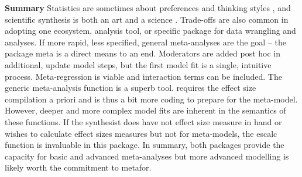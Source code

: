 \documentclass[softwarereview]{jss}
\begin{document}
\textbf{Summary} \newline
Statistics are sometimes about preferences and thinking styles \citep{RN6087}, and scientific synthesis is both an art and a science \citep{RN3629}.  Trade-offs are also common in adopting one ecosystem, analysis tool, or specific package for data wrangling and analyses.  If more rapid, less specified, general meta-analyses are the goal – the package meta is a direct means to an end.  Moderators are added post hoc in additional, update model steps, but the first model fit is a single, intuitive process.  Meta-regression is viable and interaction terms can be included.  The generic meta-analysis function is a superb tool.   requires the effect size compilation a priori and is thus a bit more coding to prepare for the meta-model.  However, deeper and more complex model fits are inherent in the semantics of these functions.  If the synthesist does have not effect size measure in hand or wishes to calculate effect sizes measures but not for meta-models, the escalc function is invaluable in this package.  In summary, both packages provide the capacity for basic and advanced meta-analyses but more advanced modelling is likely worth the commitment to metafor. \newline

\end{document}
